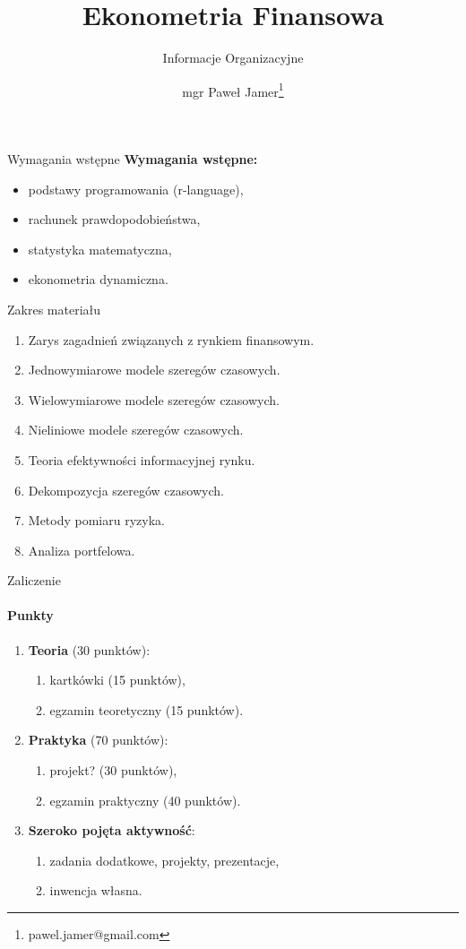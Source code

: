 \documentclass[a4paper, 11pt]{beamer}
\title{Ekonometria Finansowa}
\subtitle{Informacje Organizacyjne}
\author{mgr Paweł Jamer\thanks{pawel.jamer@gmail.com}}
\begin{document}
	\begin{frame}
		\titlepage
	\end{frame}

	\begin{frame}{Wymagania wstępne}
		\textbf{Wymagania wstępne:}
		\begin{itemize}
			\item podstawy programowania (r-language),
			\item rachunek prawdopodobieństwa,
			\item statystyka matematyczna,
			\item ekonometria dynamiczna.
		\end{itemize}
	\end{frame}
	
	\begin{frame}{Zakres materiału}
		\begin{enumerate}
			\item Zarys zagadnień związanych z rynkiem finansowym.
			\item Jednowymiarowe modele szeregów czasowych.
			\item Wielowymiarowe modele szeregów czasowych.
			\item Nieliniowe modele szeregów czasowych.
			\item Teoria efektywności informacyjnej rynku.
			\item Dekompozycja szeregów czasowych.
			\item Metody pomiaru ryzyka.
			\item Analiza portfelowa.
		\end{enumerate}
	\end{frame}

	\begin{frame}{Zaliczenie}
		\framesubtitle{Punkty}
		\begin{enumerate}
			\item \textbf{Teoria} (30 punktów):
			\begin{enumerate}
				\item kartkówki (15 punktów),
				\item egzamin teoretyczny (15 punktów).
			\end{enumerate}
			\item \textbf{Praktyka} (70 punktów):
			\begin{enumerate}
				\item projekt? (30 punktów),
				\item egzamin praktyczny (40 punktów).
			\end{enumerate}
			\item \textbf{Szeroko pojęta aktywność}:
			\begin{enumerate}
				\item zadania dodatkowe, projekty, prezentacje,
				\item inwencja własna.
			\end{enumerate}
		\end{enumerate}
	\end{frame}
	
\end{document}

